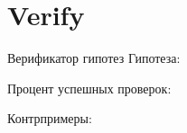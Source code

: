 \section{Verify}
\begin{frame}{Верификатор гипотез}
	Гипотеза:


	Процент успешных проверок:


	Контрпримеры:


\end{frame}

